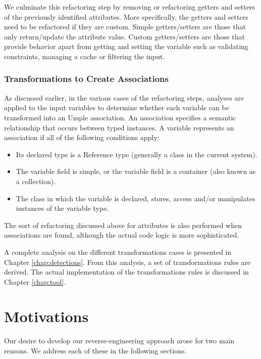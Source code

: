 We culminate this refactoring step by removing or refactoring getters and setters of the previously identified attributes. More specifically, the getters and setters need to be refactored if they are custom. Simple getters/setters are those that only return/update the attribute value.  Custom getters/setters are those that provide behavior apart from getting and setting the variable such as validating constraints, managing a cache or filtering the input.

\subsubsection{Transformations to Create Associations}

As discussed earlier, in the various cases of the refactoring steps, analyses are applied to the input variables to determine whether each variable can be transformed into an Umple association. An association specifies a semantic relationship that occurs between typed instances. A variable represents an association if all of the following conditions apply:

\begin{itemize}
\item Its declared type is a Reference type (generally a class in the current system).
\item The variable field is simple, or the variable field is a container (also known as a collection).
\item The class in which the variable is declared, stores, access and/or manipulates instances of the variable type.

\end{itemize}

The sort of refactoring discussed above for attributes is also performed when associations are found, although the actual code logic is more sophisticated.

A complete analysis on the different transformations cases is presented in Chapter \ref{chap:detections}. From this analysis, a set of transformations rules are derived. The actual implementation of the transformations rules is discussed in Chapter \ref{chap:tool}.

\section{Motivations}

Our desire to develop our reverse-engineering approach arose for two main reasons. We address each of these in the following sections.

